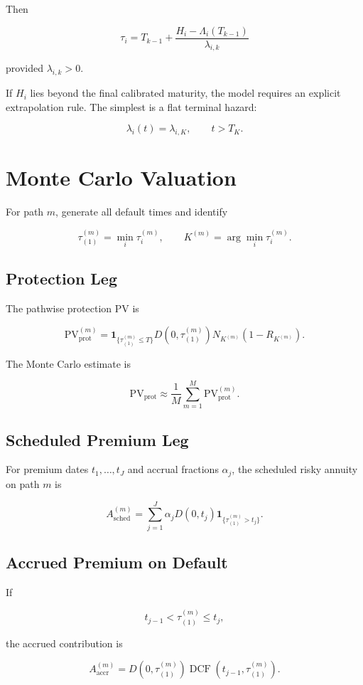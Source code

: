 \documentclass[11pt,a4paper]{article}
\newcommand{\ind}{\mathbf{1}}
\newcommand{\PV}{\mathrm{PV}}
\begin{document}
Then

\[
\boxed{
\tau_i
=
T_{k-1}
+
\frac{
H_i-\Lambda_i(T_{k-1})
}{
\lambda_{i,k}
}
}
\]

provided $\lambda_{i,k}>0$.

If $H_i$ lies beyond the final calibrated maturity, the model requires an explicit extrapolation rule. The simplest is a flat terminal hazard:

\[
\lambda_i(t)=\lambda_{i,K},
\qquad t>T_K.
\]

\section{Monte Carlo Valuation}

For path $m$, generate all default times and identify

\[
\tau_{(1)}^{(m)}
=
\min_i\tau_i^{(m)},
\qquad
K^{(m)}
=
\arg\min_i\tau_i^{(m)}.
\]

\subsection{Protection Leg}

The pathwise protection PV is

\[
\PV_{\mathrm{prot}}^{(m)}
=
\ind_{\{\tau_{(1)}^{(m)}\leq T\}}
D(0,\tau_{(1)}^{(m)})
N_{K^{(m)}}(1-R_{K^{(m)}}).
\]

The Monte Carlo estimate is

\[
\PV_{\mathrm{prot}}
\approx
\frac{1}{M}
\sum_{m=1}^{M}
\PV_{\mathrm{prot}}^{(m)}.
\]

\subsection{Scheduled Premium Leg}

For premium dates $t_1,\ldots,t_J$ and accrual fractions $\alpha_j$, the scheduled risky annuity on path $m$ is

\[
A_{\mathrm{sched}}^{(m)}
=
\sum_{j=1}^{J}
\alpha_jD(0,t_j)
\ind_{\{\tau_{(1)}^{(m)}>t_j\}}.
\]

\subsection{Accrued Premium on Default}

If

\[
t_{j-1}<\tau_{(1)}^{(m)}\leq t_j,
\]

the accrued contribution is

\[
A_{\mathrm{accr}}^{(m)}
=
D(0,\tau_{(1)}^{(m)})
\operatorname{DCF}(t_{j-1},\tau_{(1)}^{(m)}).
\]
\end{document}
